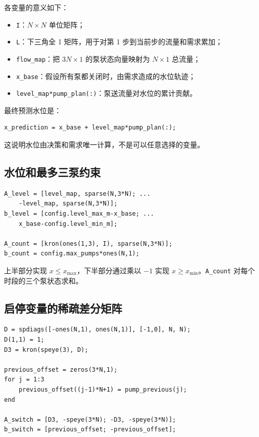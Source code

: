 \documentclass[UTF8,a4paper,11pt]{ctexart}
\newcommand{\code}[1]{\texttt{#1}}
\begin{document}
各变量的意义如下：

\begin{itemize}
  \item \code{I}：$N\times N$ 单位矩阵；
  \item \code{L}：下三角全 1 矩阵，用于对第 1 步到当前步的流量和需求累加；
  \item \code{flow\_map}：把 $3N\times1$ 的泵状态向量映射为 $N\times1$ 总流量；
  \item \code{x\_base}：假设所有泵都关闭时，由需求造成的水位轨迹；
  \item \code{level\_map*pump\_plan(:)}：泵送流量对水位的累计贡献。
\end{itemize}

最终预测水位是：

\begin{lstlisting}
x_prediction = x_base + level_map*pump_plan(:);
\end{lstlisting}

这说明水位由决策和需求唯一计算，不是可以任意选择的变量。

\subsection{水位和最多三泵约束}

\begin{lstlisting}[caption={硬水位约束与同时运行数量约束}]
A_level = [level_map, sparse(N,3*N); ...
    -level_map, sparse(N,3*N)];
b_level = [config.level_max_m-x_base; ...
    x_base-config.level_min_m];

A_count = [kron(ones(1,3), I), sparse(N,3*N)];
b_count = config.max_pumps*ones(N,1);
\end{lstlisting}

上半部分实现 $x\le x_{\max}$，下半部分通过乘以 $-1$ 实现 $x\ge x_{\min}$。\code{A\_count} 对每个时段的三个泵状态求和。

\subsection{启停变量的稀疏差分矩阵}

\begin{lstlisting}[caption={逐泵 switch 线性化}]
D = spdiags([-ones(N,1), ones(N,1)], [-1,0], N, N);
D(1,1) = 1;
D3 = kron(speye(3), D);

previous_offset = zeros(3*N,1);
for j = 1:3
    previous_offset((j-1)*N+1) = pump_previous(j);
end

A_switch = [D3, -speye(3*N); -D3, -speye(3*N)];
b_switch = [previous_offset; -previous_offset];
\end{lstlisting}
\end{document}
